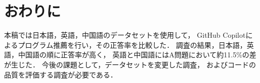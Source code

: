 \section{おわりに\label{conclusion}}
  本稿では日本語，英語，中国語のデータセットを使用して，
  GitHub Copilotによるプログラム推薦を行い，その正答率を比較した．
  調査の結果，日本語，英語，中国語の順に正答率が高く，
  英語と中国語にはA問題において約11.5\%の差が生じた．
  今後の課題として，データセットを変更した調査，
  およびコードの品質を評価する調査が必要である．
  
